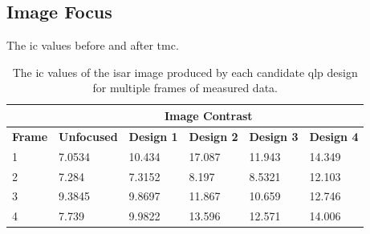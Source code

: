\documentclass[class=report,11pt,crop=false]{standalone}
\begin{document}
    \subsection{Image Focus}
    The \gls{ic} values before and after \gls{tmc}.

    \begin{table}[H]
        \centering
        \begin{tabular}{c|lllll|}
            \cline{2-6}
                                                 & \multicolumn{5}{c|}{\textbf{Image Contrast}}            \\ \hline
            \multicolumn{1}{|l|}{\textbf{Frame}} & \multicolumn{1}{l|}{\textbf{Unfocused}} & \multicolumn{1}{l|}{\textbf{Design 1}} & \multicolumn{1}{l|}{\textbf{Design 2}}              & \multicolumn{1}{l|}{\textbf{Design 3}} & \textbf{Design 4}              \\ \hline
            \multicolumn{1}{|l|}{1}              & \multicolumn{1}{l|}{7.0534}             & \multicolumn{1}{l|}{10.434}            & \multicolumn{1}{l|}{\cellcolor[HTML]{EFEFEF}17.087} & \multicolumn{1}{l|}{11.943}            & 14.349                         \\ \hline
            \multicolumn{1}{|l|}{2}              & \multicolumn{1}{l|}{7.284}              & \multicolumn{1}{l|}{7.3152}            & \multicolumn{1}{l|}{8.197}                          & \multicolumn{1}{l|}{8.5321}            & \cellcolor[HTML]{EFEFEF}12.103 \\ \hline
            \multicolumn{1}{|l|}{3}              & \multicolumn{1}{l|}{9.3845}             & \multicolumn{1}{l|}{9.8697}            & \multicolumn{1}{l|}{11.867}                         & \multicolumn{1}{l|}{10.659}            & \cellcolor[HTML]{EFEFEF}12.746 \\ \hline
            \multicolumn{1}{|l|}{4}              & \multicolumn{1}{l|}{7.739}              & \multicolumn{1}{l|}{9.9822}            & \multicolumn{1}{l|}{13.596}                         & \multicolumn{1}{l|}{12.571}            & \cellcolor[HTML]{EFEFEF}14.006 \\ \hline
        \end{tabular}
        \caption{The \gls{ic} values of the \gls{isar} image produced by each candidate \gls{qlp} design for multiple frames of measured data.}
        \label{tab:candidate_qlp_ic}
    \end{table}
    
\end{document}

